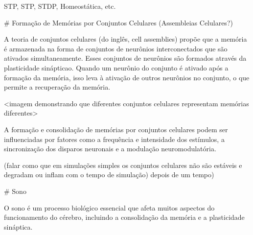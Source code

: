 STP, STP, STDP, Homeostática, etc.

# Formação de Memórias por Conjuntos Celulares (Assembleias Celulares?)
 
A teoria de conjuntos celulares (do inglês, cell assemblies) propõe que a memória é armazenada na forma de conjuntos de neurônios
interconectados que são ativados simultaneamente. Esses conjuntos de neurônios são formados através da plasticidade sinápticao.
Quando um neurônio do conjunto é ativado após a formação da memória, isso leva à ativação de outros neurônios no conjunto, o que
permite a recuperação da memória.

<imagem demonstrando que diferentes conjuntos celulares representam memórias diferentes>

A formação e consolidação de memórias por conjuntos celulares podem ser influenciadas por fatores como a frequência e intensidade
dos estímulos, a sincronização dos disparos neuronais e a modulação neuromodulatória.

(falar como que em simulações simples os conjuntos celulares não são estáveis e degradam ou inflam com o tempo de simulação)
depois de um tempo)

# Sono

O sono é um processo biológico essencial que afeta muitos aspectos do funcionamento do cérebro, incluindo a consolidação da
memória e a plasticidade sináptica.